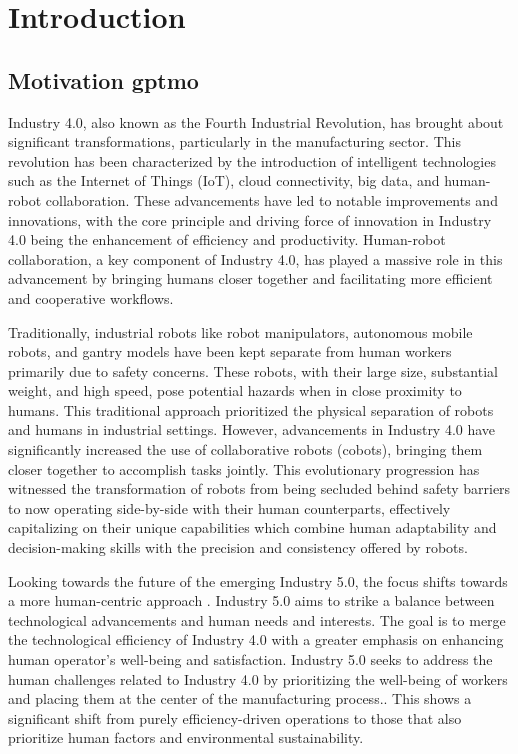 \chapter{Introduction}
\label{aufbau}

\section{Motivation \gls*{gptmo}} 

Industry 4.0, also known as the Fourth Industrial Revolution, has brought about significant transformations, particularly in the manufacturing sector. This revolution has been characterized by the introduction of intelligent technologies such as the Internet of Things (IoT), cloud connectivity, big data, and human-robot collaboration. These advancements have led to notable improvements and innovations, with the core principle and driving force of innovation in Industry 4.0 being the enhancement of efficiency and productivity. Human-robot collaboration, a key component of Industry 4.0, has played a massive role in this advancement by bringing humans closer together and facilitating more efficient and cooperative workflows. 

Traditionally, industrial robots like robot manipulators, autonomous mobile robots, and gantry models have been kept separate from human workers primarily due to safety concerns. These robots, with their large size, substantial weight, and high speed, pose potential hazards when in close proximity to humans. This traditional approach prioritized the physical separation of robots and humans in industrial settings. However, advancements in Industry 4.0 have significantly increased the use of collaborative robots (cobots), bringing them closer together to accomplish tasks jointly. This evolutionary progression has witnessed the transformation of robots from being secluded behind safety barriers to now operating side-by-side with their human counterparts, effectively capitalizing on their unique capabilities which combine human adaptability and decision-making skills with the precision and consistency offered by robots.  

Looking towards the future of the emerging Industry 5.0, the focus shifts towards a more human-centric approach \parencite{industry5}. Industry 5.0 aims to strike a balance between technological advancements and human needs and interests. The goal is to merge the technological efficiency of Industry 4.0 with a greater emphasis on enhancing human operator's well-being and satisfaction.
Industry 5.0 seeks to address the human challenges related to Industry 4.0 by prioritizing the well-being of workers and placing them at the center of the manufacturing process.\parencite{hum1}.
This shows a significant shift from purely efficiency-driven operations to those that also prioritize human factors and environmental sustainability. 



